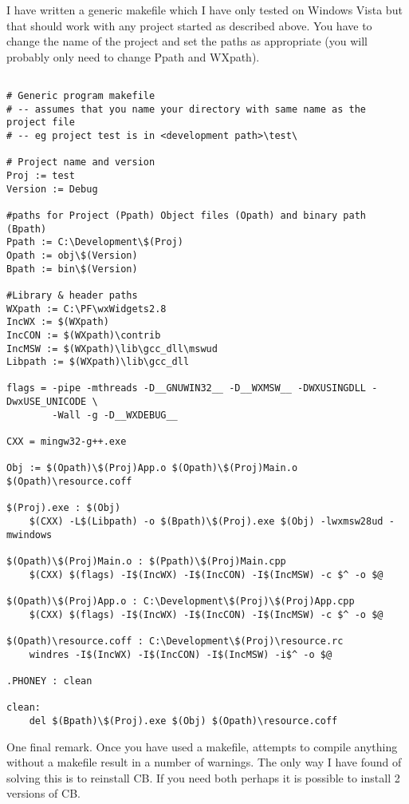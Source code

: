 I have written a generic makefile which I have only tested on Windows Vista but that should work with any project started as described above. You have to change the name of the project and set the paths as appropriate (you will probably only need to change Ppath and WXpath).

\begin{verbatim}  

# Generic program makefile
# -- assumes that you name your directory with same name as the project file
# -- eg project test is in <development path>\test\

# Project name and version
Proj := test
Version := Debug

#paths for Project (Ppath) Object files (Opath) and binary path (Bpath)
Ppath := C:\Development\$(Proj)
Opath := obj\$(Version)
Bpath := bin\$(Version)

#Library & header paths
WXpath := C:\PF\wxWidgets2.8
IncWX := $(WXpath)
IncCON := $(WXpath)\contrib
IncMSW := $(WXpath)\lib\gcc_dll\mswud
Libpath := $(WXpath)\lib\gcc_dll

flags = -pipe -mthreads -D__GNUWIN32__ -D__WXMSW__ -DWXUSINGDLL -DwxUSE_UNICODE \ 
        -Wall -g -D__WXDEBUG__

CXX = mingw32-g++.exe

Obj := $(Opath)\$(Proj)App.o $(Opath)\$(Proj)Main.o $(Opath)\resource.coff

$(Proj).exe : $(Obj)
    $(CXX) -L$(Libpath) -o $(Bpath)\$(Proj).exe $(Obj) -lwxmsw28ud -mwindows

$(Opath)\$(Proj)Main.o : $(Ppath)\$(Proj)Main.cpp
    $(CXX) $(flags) -I$(IncWX) -I$(IncCON) -I$(IncMSW) -c $^ -o $@

$(Opath)\$(Proj)App.o : C:\Development\$(Proj)\$(Proj)App.cpp
    $(CXX) $(flags) -I$(IncWX) -I$(IncCON) -I$(IncMSW) -c $^ -o $@

$(Opath)\resource.coff : C:\Development\$(Proj)\resource.rc
    windres -I$(IncWX) -I$(IncCON) -I$(IncMSW) -i$^ -o $@

.PHONEY : clean

clean:
    del $(Bpath)\$(Proj).exe $(Obj) $(Opath)\resource.coff
\end{verbatim}



One final remark. Once you have used a makefile, attempts to compile anything without a makefile result in a number of warnings. The only way I have found of solving this is to reinstall CB. If you need both perhaps it is possible to install 2 versions of CB.

